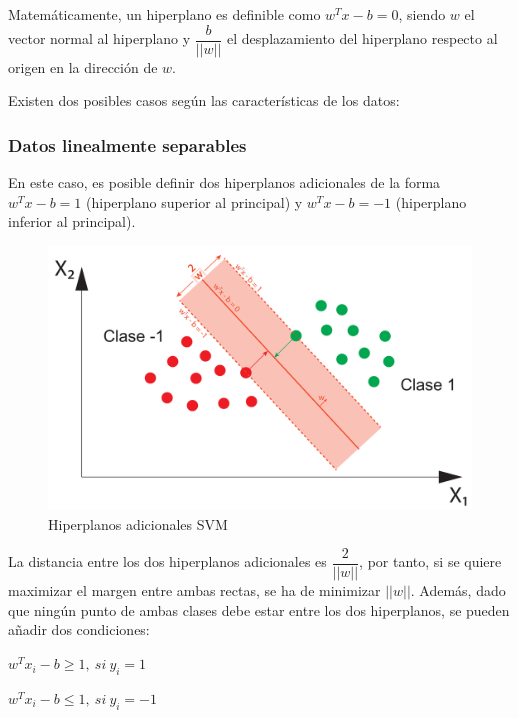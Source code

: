 Matemáticamente, un hiperplano es definible como $w^{T}x-b=0$, siendo $w$ el vector normal al hiperplano y $\dfrac{b}{||w||}$ el desplazamiento del hiperplano respecto al origen en la dirección de $w$.

Existen dos posibles casos según las características de los datos:

\subsubsection{Datos linealmente separables}

En este caso, es posible definir dos hiperplanos adicionales de la forma $w^{T}x - b = 1$ (hiperplano superior al principal) y $w^{T}x - b = -1$ (hiperplano inferior al principal).

\begin{figure}[H]
	\centering
	\captionsetup{justification=centering}
	\includegraphics[width=\textwidth]{imagenes/marco_teorico/SVM/svm_ejemplo3.pdf}
	\caption{Hiperplanos adicionales SVM}
	\label{fig:svm_ejemplo3}
\end{figure}

La distancia entre los dos hiperplanos adicionales es $\dfrac{2}{||w||}$, por tanto, si se quiere maximizar el margen entre ambas rectas, se ha de minimizar $||w||$. Además, dado que ningún punto de ambas clases debe estar entre los dos hiperplanos, se pueden añadir dos condiciones:

\begin{description}
	\centering
	\item[] $w^{T}x_{i}-b\geq1,\:si\:y_{i}=1$
	\item[] $w^{T}x_{i}-b\leq1,\:si\:y_{i}=-1$
\end{description}

